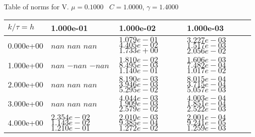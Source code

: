 \begin{center}
Table of norms for V. $\mu = 0.1000$ \, $C = 1.0000$, $\gamma = 1.4000$
  
\begin{tabular}{|p{1in}|p{1in}|p{1in}|p{1in}|} \hline
$k / \tau = h$ &1.000e-01 &1.000e-02 &1.000e-03 \\ \hline 
0.000e+00 & $nan$  $nan$  $nan$  & $1.079e-01$  $4.405e-02$  $1.733e+00$  & $3.227e-03$  $1.517e-03$  $2.056e-02$  \\ \hline 
1.000e+00 & $nan$  $-nan$  $-nan$  & $1.810e-02$  $8.495e-03$  $1.140e-01$  & $1.606e-03$  $7.482e-04$  $1.017e-02$  \\ \hline 
2.000e+00 & $nan$  $nan$  $nan$  & $8.190e-03$  $3.946e-03$  $5.295e-02$  & $8.015e-04$  $3.715e-04$  $5.057e-03$  \\ \hline 
3.000e+00 & $nan$  $nan$  $nan$  & $4.044e-03$  $1.909e-03$  $2.579e-02$  & $4.003e-04$  $1.851e-04$  $2.522e-03$  \\ \hline 
4.000e+00 & $2.354e-02$  $1.143e-02$  $1.210e-01$  & $2.010e-03$  $9.385e-04$  $1.272e-02$  & $2.001e-04$  $9.241e-05$  $1.259e-03$  \\ \hline 

\end{tabular}\\[20pt]
\end{center}
